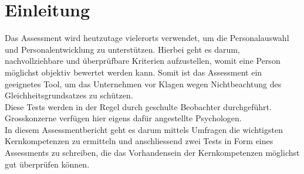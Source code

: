 
\chapter{Einleitung}

Das Assessment wird heutzutage vielerorts verwendet, um die Personalauswahl und Personalentwicklung zu unterstützen. Hierbei geht es darum, nachvollziehbare und überprüfbare Kriterien aufzustellen, womit eine Person möglichst objektiv bewertet werden kann. Somit ist das Assessment ein geeignetes Tool, um das Unternehmen vor Klagen wegen Nichtbeachtung des Gleichheitsgrundsatzes zu schützen. \\ 
Diese Tests werden in der Regel durch geschulte Beobachter durchgeführt. Grosskonzerne verfügen hier eigens dafür angestellte Psychologen. \\
In diesem Assessmentbericht geht es darum mittels Umfragen die wichtigsten Kernkompetenzen zu ermitteln und anschliessend zwei Tests in Form eines Assessments zu schreiben, die das Vorhandensein der Kernkompetenzen möglichst gut überprüfen können.
  

